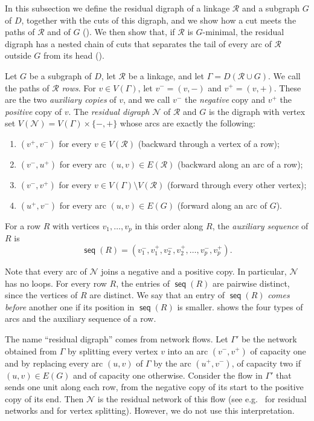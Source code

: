 \documentclass[fontsize=12pt,leading=14pt]{fullpaper}
\DeclareMathOperator{\seq}{\mathsf{seq}}
\newcommand{\Ncal}{\mathcal{N}}
\newcommand{\Rcal}{\mathcal{R}}
\begin{document}
In this subsection we define the residual digraph of a linkage $\Rcal$ and a subgraph $G$ of $D$, together with the cuts of this digraph, and we show how a cut meets the paths of $\Rcal$ and of $G$ ().
We then show that, if $\Rcal$ is $G$-minimal, the residual digraph has a nested chain of cuts that separates the tail of every arc of $\Rcal$ outside $G$ from its head ().

\begin{definition}\label{def:residual}
  Let $G$ be a subgraph of $D$, let $\Rcal$ be a linkage, and let $\Gamma=D(\Rcal\cup G)$.
  We call the paths of $\Rcal$ \emph{rows}.
  For $v\in V(\Gamma)$, let $v^-=(v,-)$ and $v^+=(v,+)$.
  These are the two \emph{auxiliary copies} of $v$, and we call $v^-$ the \emph{negative} copy and $v^+$ the \emph{positive} copy of $v$.
  The \emph{residual digraph} $\Ncal$ of $\Rcal$ and $G$ is the digraph with vertex set $V(\Ncal)=V(\Gamma)\times\{-,+\}$ whose arcs are exactly the following:
  \begin{enumerate}[label=\textnormal{(N\arabic*)}]
    \item\label{item:N1} $(v^+,v^-)$ for every $v\in V(\Rcal)$ (backward through a vertex of a row);
    \item\label{item:N2} $(v^-,u^+)$ for every arc $(u,v)\in E(\Rcal)$ (backward along an arc of a row);
    \item\label{item:N3} $(v^-,v^+)$ for every $v\in V(\Gamma)\setminus V(\Rcal)$ (forward through every other vertex);
    \item\label{item:N4} $(u^+,v^-)$ for every arc $(u,v)\in E(G)$ (forward along an arc of $G$).
  \end{enumerate}
  For a row $R$ with vertices $v_1,\dots,v_p$ in this order along $R$, the \emph{auxiliary sequence} of $R$ is
  \[
    \seq(R)=(v_1^-,v_1^+,v_2^-,v_2^+,\dots,v_p^-,v_p^+).
  \]
\end{definition}

Note that every arc of $\Ncal$ joins a negative and a positive copy.
In particular, $\Ncal$ has no loops.
For every row $R$, the entries of $\seq(R)$ are pairwise distinct, since the vertices of $R$ are distinct.
We say that an entry of $\seq(R)$ \emph{comes before} another one if its position in $\seq(R)$ is smaller.
 shows the four types of arcs and the auxiliary sequence of a row.

The name ``residual digraph'' comes from network flows.
Let $\Gamma'$ be the network obtained from $\Gamma$ by splitting every vertex $v$ into an arc $(v^-,v^+)$ of capacity one and by replacing every arc $(u,v)$ of $\Gamma$ by the arc $(u^+,v^-)$, of capacity two if $(u,v)\in E(G)$ and of capacity one otherwise.
Consider the flow in $\Gamma'$ that sends one unit along each row, from the negative copy of its start to the positive copy of its end.
Then $\Ncal$ is the residual network of this flow (see e.g.~\cite[sections~3.1.2 and~3.2.4]{BangJensenG02} for residual networks and for vertex splitting).
However, we do not use this interpretation.
\end{document}
